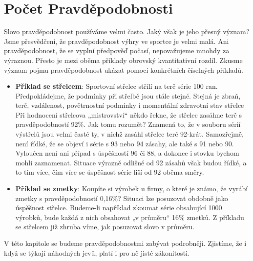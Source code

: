{
\chapter{Počet Pravděpodobnosti}
\minitoc
  Slovo pravděpodobnost používáme velmi často. Jaký však je jeho přesný význam? Jsme přesvědčeni, 
  že pravděpodobnost výhry ve sportce je velmi malá. Ani pravděpodobnost, že se vyplní předpověď 
  počasí, nepovažujeme mnohdy za výraznou. Přesto je mezi oběma příklady obrovský kvantitativní 
  rozdíl. Zkusme význam pojmu pravděpodobnost ukázat pomocí konkrétních číselných příkladů.
  
  \begin{itemize}
    \item \textbf{Příklad se střelcem}: Sportovní střelec střílí na terč série \num{100} ran. 
          Předpokládejme, že podmínky při střelbě jsou stále stejné. Stejná je zbraň, terč, 
          vzdálenost, povětrnostní podmínky i momentální zdravotní stav střelce Při hodnocení 
          střelcova „mistrovství“ někdo řekne, že střelec zasáhne terč s pravděpodobností 
          \num{92}\%. Jak tomu rozumět? Znamená to, že v souboru sérií výstřelů jsou velmi časté 
          ty, v nichž zasáhl střelec terč \num{92}-krát. Samozřejmě, není řídké, že se objeví i 
          série s \num{93} nebo \num{94} zásahy, ale také s \num{91} nebo \num{90}. Vyloučen není 
          ani případ s úspěšností \num{96} či \num{88}, a dokonce i stovku bychom mohli zaznamenat. 
          Situace výrazně odlišné od \num{92} zásahů však budou řídké, a to tím více, čím více se 
          úspěšnost série liší od \num{92} oběma směry.
    \item \textbf{Příklad se zmetky}: Koupíte si výrobek u firmy, o které je známo, že vyrábí 
          zmetky s pravděpodobností 0,16\%? Situaci lze posuzovat obdobně jako úspěšnost střelce. 
          Budeme-li například zkoumat série obsahující 1000 výrobků, bude každá z nich obsahovat „v 
          průměru“ 16\% zmetků. Z příkladu se střelcem již zhruba víme, jak posuzovat slovo v 
          průměru.
  \end{itemize}
  
  V této kapitole se budeme pravděpodobnostmi zabývat podrobněji. Zjistíme, že i když se týkají 
  náhodných jevů, platí i pro ně jisté zákonitosti.
    
}
